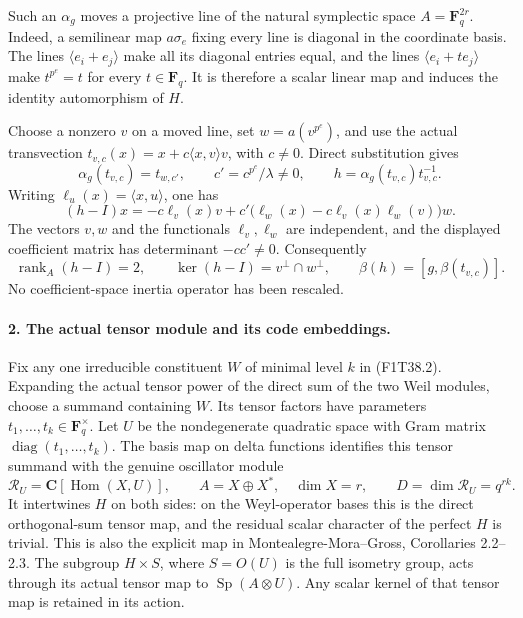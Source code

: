Such an \(\alpha_g\) moves a projective line of the natural
symplectic space \(A=\mathbf F_q^{2r}\). Indeed, a
semilinear map \(a\sigma_e\) fixing every line is diagonal
in the coordinate basis. The lines \(\langle e_i+e_j\rangle\)
make all its diagonal entries equal, and the lines
\(\langle e_i+t e_j\rangle\) make \(t^{p^e}=t\) for
every \(t\in\mathbf F_q\). It is therefore a scalar linear
map and induces the identity automorphism of \(H\).

Choose a nonzero \(v\) on a moved line, set
\(w=a(v^{p^e})\), and use the actual transvection
\(t_{v,c}(x)=x+c\langle x,v\rangle v\), with \(c\ne0\).
Direct substitution gives
\[
 \alpha_g(t_{v,c})=t_{w,c'},\qquad
 c'=c^{p^e}/\lambda\ne0,
 \qquad h=\alpha_g(t_{v,c})t_{v,c}^{-1}.
 \tag{F1T38.4}
\]
Writing \(\ell_u(x)=\langle x,u\rangle\), one has
\[
 (h-I)x=-c\ell_v(x)v+
 c'\bigl(\ell_w(x)-c\ell_v(x)\ell_w(v)\bigr)w.
 \tag{F1T38.5}
\]
The vectors \(v,w\) and the functionals \(\ell_v,\ell_w\)
are independent, and the displayed coefficient matrix
has determinant \(-cc'\ne0\). Consequently
\[
 \operatorname{rank}_A(h-I)=2,\qquad
 \ker(h-I)=v^\perp\cap w^\perp,
 \qquad
 \beta(h)=[g,\beta(t_{v,c})].
 \tag{F1T38.6}
\]
No coefficient-space inertia operator has been rescaled.

\paragraph{2. The actual tensor module and its code embeddings.}
Fix any one irreducible constituent \(W\) of minimal level
\(k\) in (F1T38.2). Expanding the actual tensor power of
the direct sum of the two Weil modules, choose a summand
containing \(W\). Its tensor factors have parameters
\(t_1,\ldots,t_k\in\mathbf F_q^\times\). Let \(U\) be
the nondegenerate quadratic space with Gram matrix
\(\operatorname{diag}(t_1,\ldots,t_k)\). The basis map
on delta functions identifies this tensor summand with
the genuine oscillator module
\[
 \mathcal R_U=\mathbf C[\operatorname{Hom}(X,U)],
 \qquad A=X\oplus X^*,\quad\dim X=r,
 \qquad D=\dim\mathcal R_U=q^{rk}.
 \tag{F1T38.7}
\]
It intertwines \(H\) on both sides: on the Weyl-operator
bases this is the direct orthogonal-sum tensor map, and
the residual scalar character of the perfect \(H\) is
trivial. This is also the explicit map in
Montealegre-Mora--Gross, Corollaries 2.2--2.3.
The subgroup \(H\times S\), where \(S=O(U)\) is the
full isometry group, acts through its actual tensor map
to \(\operatorname{Sp}(A\otimes U)\). Any scalar kernel
of that tensor map is retained in its action.

